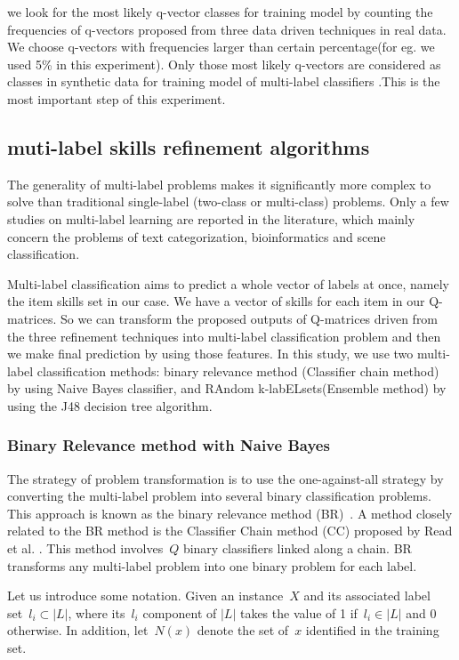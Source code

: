 \documentclass[11pt]{article}
\begin{document}
 we look for the most likely q-vector classes for training model by counting the frequencies of q-vectors proposed from three data driven techniques in real data. We choose q-vectors with frequencies larger than certain percentage(for eg. we used 5\% in this experiment). Only those most likely q-vectors are considered as classes in synthetic data for training model of multi-label classifiers .This is the most important step of this experiment.  

\subsection{muti-label skills refinement algorithms}

The generality of multi-label problems makes it significantly more complex to solve than traditional single-label (two-class or multi-class) problems. Only a few studies on multi-label learning are reported in the literature, which mainly concern the problems of text categorization, bioinformatics and scene classification. 

Multi-label classification aims to predict a whole vector of labels at once, namely the item skills set in our case. We have a vector of skills for each item in our Q-matrices. So we can transform the proposed outputs of Q-matrices driven from the three refinement techniques into multi-label classification problem and then we make final prediction by using those features. In this study, we use two multi-label classification methods: binary relevance method (Classifier chain method)~\cite{read2011classifier} by using Naive Bayes classifier, and RAndom k-labELsets(Ensemble method) \cite{Tsoumakas2011random} by using the J48 decision tree algorithm.

\subsubsection{Binary Relevance method with Naive Bayes}
The strategy of problem transformation is to use the one-against-all strategy by converting the multi-label problem into several binary classification problems. This approach is known as the binary relevance method (BR)~\cite{read2011classifier}. A method closely related to the BR method is the Classifier Chain method (CC) proposed by Read et al. \cite{read2011classifier}. This method involves~$Q$ binary classifiers linked along a chain. BR transforms any multi-label problem into one binary problem for each label. 

Let us introduce some notation. Given an instance~$X$ and its associated label set~$l_i \subset |L|$, where its~$l_i$ component of  $ |L|$ takes the value of 1 if~$l_i \in |L|$ and 0 otherwise. In addition, let~$N(x)$ denote the set of~$x$ identified in the training set.
\end{document}
